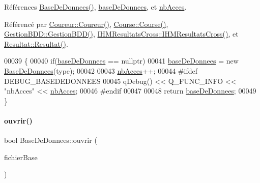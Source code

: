 Références \hyperlink{class_base_de_donnees_a10dd177f1008f675ab78c2221b2a6750}{Base\+De\+Donnees()}, \hyperlink{class_base_de_donnees_a822ba0b7cf85b1e48ced8efd3d65e266}{base\+De\+Donnees}, et \hyperlink{class_base_de_donnees_a5099ecb2922bb31d84cd5d4505298a29}{nb\+Acces}.



Référencé par \hyperlink{class_coureur_af3a5607d96a0960b1666164f6a74d539}{Coureur\+::\+Coureur()}, \hyperlink{class_course_af6317ecab95f8a2eb205b4f91b530992}{Course\+::\+Course()}, \hyperlink{class_gestion_b_d_d_a406bdb9b1714b204fa6fab015baffc27}{Gestion\+B\+D\+D\+::\+Gestion\+B\+D\+D()}, \hyperlink{class_i_h_m_resultats_cross_a94afa0356ebc98e497dfecca3e1bb00b}{I\+H\+M\+Resultats\+Cross\+::\+I\+H\+M\+Resultats\+Cross()}, et \hyperlink{class_resultat_a57e458f7abfc7463786ae9212bf55cd5}{Resultat\+::\+Resultat()}.


\begin{DoxyCode}
00039 \{
00040     \textcolor{keywordflow}{if}(\hyperlink{class_base_de_donnees_a822ba0b7cf85b1e48ced8efd3d65e266}{baseDeDonnees} == \textcolor{keyword}{nullptr})
00041         \hyperlink{class_base_de_donnees_a822ba0b7cf85b1e48ced8efd3d65e266}{baseDeDonnees} = \textcolor{keyword}{new} \hyperlink{class_base_de_donnees_a10dd177f1008f675ab78c2221b2a6750}{BaseDeDonnees}(type);
00042 
00043     \hyperlink{class_base_de_donnees_a5099ecb2922bb31d84cd5d4505298a29}{nbAcces}++;
00044 \textcolor{preprocessor}{    #ifdef DEBUG\_BASEDEDONNEES}
00045     qDebug() << Q\_FUNC\_INFO << \textcolor{stringliteral}{"nbAcces"} << \hyperlink{class_base_de_donnees_a5099ecb2922bb31d84cd5d4505298a29}{nbAcces};
00046 \textcolor{preprocessor}{    #endif}
00047 
00048     \textcolor{keywordflow}{return} \hyperlink{class_base_de_donnees_a822ba0b7cf85b1e48ced8efd3d65e266}{baseDeDonnees};
00049 \}
\end{DoxyCode}
\mbox{\label{class_base_de_donnees_a7f6a5510b08017b0d99115a84252f186}} 
\paragraph{\texorpdfstring{ouvrir()}{ouvrir()}}
{\footnotesize\ttfamily bool Base\+De\+Donnees\+::ouvrir (\begin{DoxyParamCaption}\item[{Q\+String}]{fichier\+Base }\end{DoxyParamCaption})}



